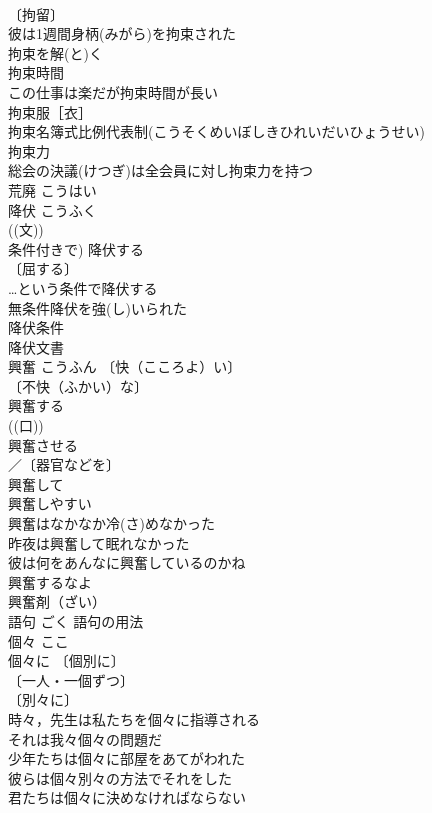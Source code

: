 \documentclass[8pt]{extreport}
\begin{document}
\begin{CJK}{UTF8}{min}
\\	〔拘留〕
\\	彼は1週間身柄(みがら)を拘束された 
\\	拘束を解(と)く 
\\	拘束時間 
\\	この仕事は楽だが拘束時間が長い 
\\	拘束服［衣］ 
\\	拘束名簿式比例代表制(こうそくめいぼしきひれいだいひょうせい) 
\\	拘束力 
\\	総会の決議(けつぎ)は全会員に対し拘束力を持つ 
\\	荒廃	こうはい	
\\	降伏	こうふく	
\\	((文)) 
\\	条件付きで) 降伏する 
\\	〔屈する〕
\\	…という条件で降伏する 
\\	無条件降伏を強(し)いられた 
\\	降伏条件 
\\	降伏文書 
\\	興奮	こうふん	〔快（こころよ）い〕
\\	〔不快（ふかい）な〕
\\	興奮する 
\\	((口)) 
\\	興奮させる 
\\	／〔器官などを〕
\\	興奮して 
\\	興奮しやすい 
\\	興奮はなかなか冷(さ)めなかった 
\\	昨夜は興奮して眠れなかった 
\\	彼は何をあんなに興奮しているのかね 
\\	興奮するなよ 
\\	興奮剤（ざい） 
\\	語句	ごく	語句の用法 
\\	個々	ここ	
\\	個々に 〔個別に〕
\\	〔一人・一個ずつ〕
\\	〔別々に〕
\\	時々，先生は私たちを個々に指導される 
\\	それは我々個々の問題だ 
\\	少年たちは個々に部屋をあてがわれた 
\\	彼らは個々別々の方法でそれをした 
\\	君たちは個々に決めなければならない 

\end{CJK}
\end{document}
